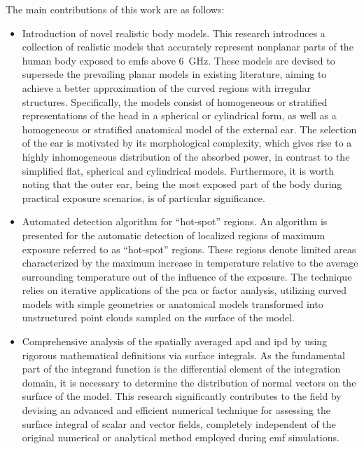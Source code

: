The main contributions of this work are as follows:
\begin{itemize}
    \item Introduction of novel realistic body models.
    This research introduces a collection of realistic models that accurately represent nonplanar parts of the human body exposed to \gls{emf}s above \SI{6}{\GHz}.
    These models are devised to supersede the prevailing planar models in existing literature, aiming to achieve a better approximation of the curved regions with irregular structures.
    Specifically, the models consist of homogeneous or stratified representations of the head in a spherical or cylindrical form, as well as a homogeneous or stratified anatomical model of the external ear.
    The selection of the ear is motivated by its morphological complexity, which gives rise to a highly inhomogeneous distribution of the absorbed power, in contrast to the simplified flat, spherical and cylindrical models. Furthermore, it is worth noting that the outer ear, being the most exposed part of the body during practical exposure scenarios, is of particular significance.
    \item Automated detection algorithm for ``hot-spot'' regions.
    An algorithm is presented for the automatic detection of localized regions of maximum exposure referred to as ``hot-spot'' regions.
    These regions denote limited areas characterized by the maximum increase in temperature relative to the average surrounding temperature out of the influence of the exposure.
    The technique relies on iterative applications of the \gls{pca} or factor analysis, utilizing curved models with simple geometries or anatomical models transformed into unstructured point clouds sampled on the surface of the model.
    \item Comprehensive analysis of the spatially averaged \gls{apd} and \gls{ipd}  by using rigorous mathematical definitions via surface integrals.
    As the fundamental part of the integrand function is the differential element of the integration domain, it is necessary to determine the distribution of normal vectors on the surface of the model. 
    This research significantly contributes to the field by devising an advanced and efficient numerical technique for assessing the surface integral of scalar and vector fields, completely independent of the original numerical or analytical method employed during \gls{emf} simulations.
\end{itemize}

